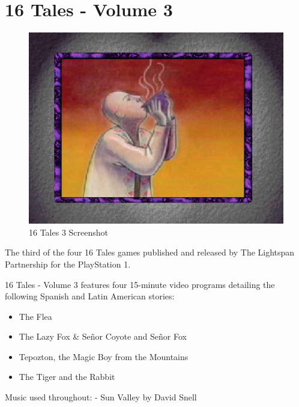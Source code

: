\chapter{16 Tales - Volume 3}

\begin{figure}[H]
    \centering
    \includegraphics[width=\textwidth/2]{"./Games/16Tales/Images/16Tales3Screenshot.png"}
    \caption{16 Tales 3 Screenshot}
\end{figure}

The third of the four 16 Tales games published and released by The Lightspan Partnership for the PlayStation 1.

16 Tales - Volume 3 features four 15-minute video programs detailing the following Spanish and Latin American stories:

\begin{itemize}
    \item The Flea
    \item The Lazy Fox \& Señor Coyote and Señor Fox
    \item Tepozton, the Magic Boy from the Mountains
    \item The Tiger and the Rabbit
\end{itemize}

Music used throughout:
- Sun Valley by David Snell

